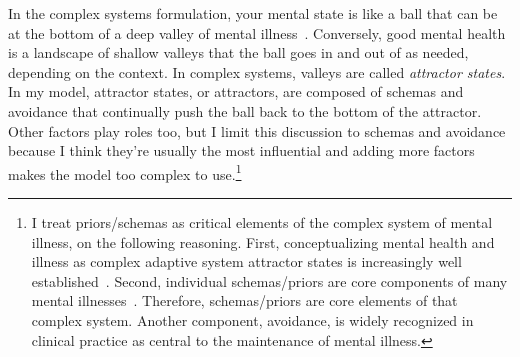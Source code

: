 \documentclass[11pt,oneside]{book}
\let\cite\parencite
\begin{document}
In the complex systems formulation, your mental state is like a ball that can be at the bottom of a deep valley of mental illness~\cite{hayes2020complex}. Conversely, good mental health is a landscape of shallow valleys that the ball goes in and out of as needed, depending on the context. In complex systems, valleys are called \textit{attractor states}. In my model, attractor states, or attractors, are composed of schemas and avoidance that continually push the ball back to the bottom of the attractor. Other factors play roles too, but I limit this discussion to schemas and avoidance because I think they're usually the most influential and adding more factors makes the model too complex to use.\footnote{\label{complexPriors}I treat priors/schemas as critical elements of the complex system of mental illness, on the following reasoning. First, conceptualizing mental health and illness as complex adaptive system attractor states is increasingly well established~\cite{hayes2020complex}. Second, individual schemas/priors are core components of many mental illnesses~\cite{eckerUnlocking}. Therefore, schemas/priors are core elements of that complex system. Another component, avoidance, is widely recognized in clinical practice as central to the maintenance of mental illness.}
\end{document}
